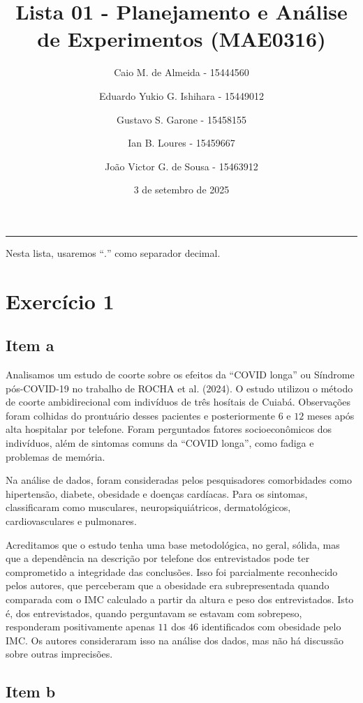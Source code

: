 \documentclass[
  portuguese,
  letterpaper,
  DIV=11,
  numbers=noendperiod]{scrarticle}
\title{Lista 01 - Planejamento e Análise de Experimentos (MAE0316)}
\author{Caio M. de Almeida - 15444560 \and Eduardo Yukio G. Ishihara -
15449012 \and Gustavo S. Garone - 15458155 \and Ian B. Loures -
15459667 \and João Victor G. de Sousa - 15463912}
\date{3 de setembro de 2025}
\begin{document}
\maketitle


\vspace{-0.5cm}\noindent\rule{\textwidth}{1pt}

Nesta lista, usaremos ``\(.\)'' como separador decimal.

\section{Exercício 1}\label{exercuxedcio-1}

\subsection{Item a}\label{item-a}

Analisamos um estudo de coorte sobre os efeitos da ``COVID longa'' ou
Síndrome pós-COVID-19 no trabalho de ROCHA et al. (2024). O estudo
utilizou o método de coorte ambidirecional com indivíduos de três
hosítais de Cuiabá. Observações foram colhidas do prontuário desses
pacientes e posteriormente \(6\) e \(12\) meses após alta hospitalar por
telefone. Foram perguntados fatores socioeconômicos dos indivíduos, além
de sintomas comuns da ``COVID longa'', como fadiga e problemas de
memória.

Na análise de dados, foram consideradas pelos pesquisadores comorbidades
como hipertensão, diabete, obesidade e doenças cardíacas. Para os
sintomas, classificaram como musculares, neuropsiquiátricos,
dermatológicos, cardiovasculares e pulmonares.

Acreditamos que o estudo tenha uma base metodológica, no geral, sólida,
mas que a dependência na descrição por telefone dos entrevistados pode
ter comprometido a integridade das conclusões. Isso foi parcialmente
reconhecido pelos autores, que perceberam que a obesidade era
subrepresentada quando comparada com o IMC calculado a partir da altura
e peso dos entrevistados. Isto é, dos entrevistados, quando perguntavam
se estavam com sobrepeso, responderam positivamente apenas \(11\) dos
\(46\) identificados com obesidade pelo IMC. Os autores consideraram
isso na análise dos dados, mas não há discussão sobre outras
imprecisões.

\subsection{Item b}\label{item-b}
\end{document}
